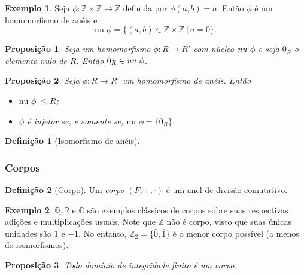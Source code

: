 \documentclass[a4paper,12pt]{report}
\theoremstyle{plain}
\newtheorem{proposicao}{Proposição}[section]
\theoremstyle{definition}
\newtheorem{definicao}{Definição}[section]
\newtheorem{exemplo}{Exemplo}[section]
\begin{document}
\begin{exemplo}
	Seja $\phi: \mathbb{Z}\times \mathbb{Z} \longrightarrow \mathbb{Z}$ definida por $\phi(a,b) = a$. Então $\phi$ é um homomorfismo de anéis e
	$$\text{nu }\phi = \{(a,b) \in \mathbb{Z}\times \mathbb{Z} \ | \ a = 0\}.$$
\end{exemplo}

\begin{proposicao}
	Seja um homomorfismo $\phi:R\longrightarrow R'$ com núcleo $\text{\emph{nu} }\phi$ e seja $0_R$ o elemento nulo de $R$. Então $0_R \in \text{\emph{nu} }\phi$.
\end{proposicao}

\begin{proposicao}
	Seja $\phi: R \longrightarrow R'$ um homomorfismo de anéis. Então 
	\begin{itemize}
		\item $\text{nu } \phi\; \leq R$;
		\item $\phi$ é injetor se, e somente se, $\text{nu }\phi = \{0_R\}$.
	\end{itemize}
\end{proposicao}

\begin{definicao}[Isomorfismo de anéis]
	 
\end{definicao}

\subsubsection{Corpos}

\begin{definicao}[Corpo]
	Um \textit{corpo} $(F, +, \cdot)$ é um anel de divisão comutativo.
\end{definicao}

\begin{exemplo}
	$\mathbb{Q}, \mathbb{R}$ e $\mathbb{C}$ são exemplos clássicos de corpos sobre suas respectivas adições e multiplicações usuais.
	Note que $\mathbb{Z}$ não é corpo, visto que suas únicas unidades são $1$ e $-1$. 
	No entanto, $\mathbb{Z}_2 = \{\bar 0,\bar 1\}$ é o menor corpo possível (a menos de isomorfismos).
\end{exemplo}

\begin{proposicao}
	Todo domínio de integridade finito é um corpo.
\end{proposicao} %
\end{document}
